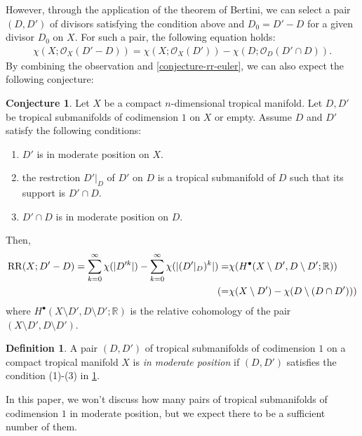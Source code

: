 \documentclass[a4paper,dvipdfmx,reqno,12pt]{amsart}
\theoremstyle{definition}
\newtheorem{definition}[theorem]{Definition}
\newtheorem{conjecture}[theorem]{Conjecture}
\newcommand{\opn}[1]{\operatorname{#1}}
\numberwithin{equation}{section}
\begin{document}
However, through the application of the theorem of
Bertini, we can select a pair $(D,D')$ of divisors 
satisfying the condition above 
and $D_0=D'-D$ for a given divisor $D_0$ on $X$.
For such a pair, the following equation holds:
\begin{align}
\chi(X;\mathcal{O}_X(D'-D))=
\chi(X;\mathcal{O}_X(D'))-
\chi(D;\mathcal{O}_D(D'\cap D)).
\end{align}
By combining the observation and \cref{conjecture-rr-euler}, 
we can also expect the following conjecture:
\begin{conjecture}
\label{conjecture-rr-bertini}
Let $X$ be a compact $n$-dimensional
tropical manifold. 
Let $D,D'$ be tropical submanifolds of codimension $1$
on $X$ or empty.
Assume $D$ and $D'$ satisfy the following conditions:
\begin{enumerate}
\item $D'$ is in moderate position on $X$.
\item the restrction $D'|_{D}$ of $D'$ on $D$ is 
a tropical submanifold of $D$ such that its support is   
$D'\cap D$.
\item $D'\cap D$ is in moderate position on $D$.
\end{enumerate}
Then,
\begin{align}
\label{equation-rr-bertini}
\opn{RR}(X;D'-D)=\sum_{k=0}^{\infty}\chi(|D'^k|)-
\sum_{k=0}^{\infty}\chi(|(D'|_{D})^k|)
=&\chi(H^{\bullet}(X\setminus D',D\setminus D';\mathbb{R})) \notag \\
(=&\chi(X\setminus D')-\chi(D\setminus (D\cap D')))
\end{align}
where $H^{\bullet}(X\setminus D',D\setminus D';\mathbb{R})$
is the relative cohomology of the pair
$(X\setminus D',D\setminus D')$.
\end{conjecture}

\begin{definition}
A pair $(D,D')$ of tropical submanifolds of codimension 
$1$ on a compact tropical manifold $X$ is 
\emph{in moderate position} if $(D,D')$ satisfies
the condition (1)-(3) in \cref{conjecture-rr-bertini}.
\end{definition}
In this paper, we won't discuss how many pairs of 
tropical submanifolds of codimension $1$ in moderate position,
but we expect there to be a sufficient number of them.
\end{document}
